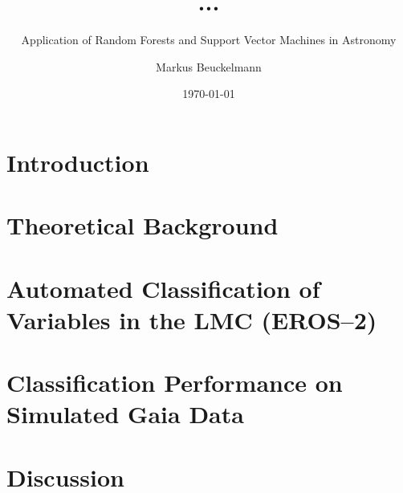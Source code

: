 

\title{...}
\subtitle{Application of Random Forests and Support Vector Machines in Astronomy}

\author{Markus Beuckelmann}
\date{\today}






\label{sec:abstract}

\tableofcontents

\newpage

\chapter{Introduction}
\label{sec:introduction}


\chapter{Theoretical Background}
\label{sec:theory}


\chapter{Automated Classification of Variables in the LMC (EROS--2)}
\label{sec:main}


\chapter{Classification Performance on Simulated Gaia Data}
\label{sec:main-gaia}


\chapter{Discussion}
\label{sec:discussion}


\cleardoublepage
{}
\listoffigures







\label{sec:declaration}


